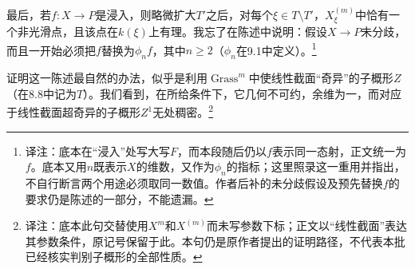\documentclass[openany,fontset=fandol]{ctexbook}
\newcommand{\note}[1]{\footnote{译注：#1}}
\begin{document}
最后，若$f\colon X\to P$是浸入，则略微扩大$T'$之后，对每个$\xi\in T\setminus T'$，$X_\xi^{(m)}$中恰有一个非光滑点，且该点在$k(\xi)$上有理。我忘了在陈述中说明：假设$X\to P$未分歧，而且一开始必须把$f$替换为$\phi_n f$，其中$n\geq2$（$\phi_n$在9.1中定义）。\note{底本在“浸入”处写大写$F$，而本段随后仍以$f$表示同一态射，正文统一为$f$。底本又用$n$既表示$X$的维数，又作为$\phi_n$的指标；这里照录这一重用并指出，不自行断言两个用途必须取同一数值。作者后补的未分歧假设及预先替换$f$的要求仍是陈述的一部分，不能遗漏。}

证明这一陈述最自然的办法，似乎是利用$\operatorname{Grass}^m$中使线性截面“奇异”的子概形$Z$（在8.8中记为$T$）。我们看到，在所给条件下，它几何不可约，余维为一，而对应于线性截面超奇异的子概形$Z^1$无处稠密。\note{底本此句交替使用$X^m$和$X^{(m)}$而未写参数下标；正文以“线性截面”表达其参数条件，原记号保留于此。本句仍是原作者提出的证明路径，不代表本批已经核实判别子概形的全部性质。}
\end{document}
